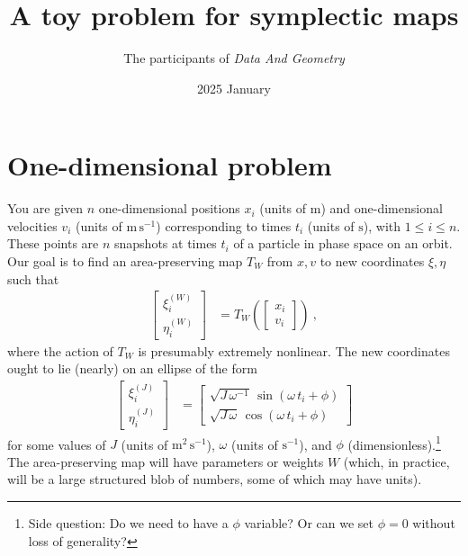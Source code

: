 \documentclass{article}
\title{\bfseries%
A toy problem for symplectic maps}
\author{The participants of \textsl{Data And Geometry}}
\date{2025 January}
\newcommand{\unit}[1]{\mathrm{#1}}
\newcommand{\m}{\unit{m}}
\newcommand{\s}{\unit{s}}
\newcommand{\ps}{\s^{-1}}
\newcommand{\mps}{\m\,\ps}
\newcommand{\mmps}{\m^2\,\ps}
\begin{document}
\maketitle

\section{One-dimensional problem}
You are given $n$ one-dimensional positions $x_i$ (units of $\m$) and one-dimensional velocities $v_i$ (units of $\mps$) corresponding to times $t_i$ (units of $\s$), with $1\leq i\leq n$.
These points are $n$ snapshots at times $t_i$ of a particle in phase space on an orbit.
Our goal is to find an area-preserving map $T_W$ from $x, v$ to new coordinates $\xi, \eta$ such that
\begin{align}
    \begin{bmatrix}\xi^{(W)}_i \\ \eta^{(W)}_i\end{bmatrix} &= T_W(\begin{bmatrix}x_i \\ v_i\end{bmatrix}) ~,
\end{align}
where the action of $T_W$ is presumably extremely nonlinear.
The new coordinates ought to lie (nearly) on an ellipse of the form
\begin{align}
    \begin{bmatrix}\xi^{(J)}_i \\ \eta^{(J)}_i\end{bmatrix} &= \begin{bmatrix}\sqrt{J\,\omega^{-1}}\,\sin(\omega\,t_i+\phi) \\ \sqrt{J\,\omega}\,\cos(\omega\,t_i+\phi)\end{bmatrix}
\end{align}
for some values of $J$ (units of $\mmps$), $\omega$ (units of $\ps$), and $\phi$ (dimensionless).\footnote{Side question: Do we need to have a $\phi$ variable? Or can we set $\phi=0$ without loss of generality?}
The area-preserving map will have parameters or weights $W$ (which, in practice, will be a large structured blob of numbers, some of which may have units).
\end{document}
